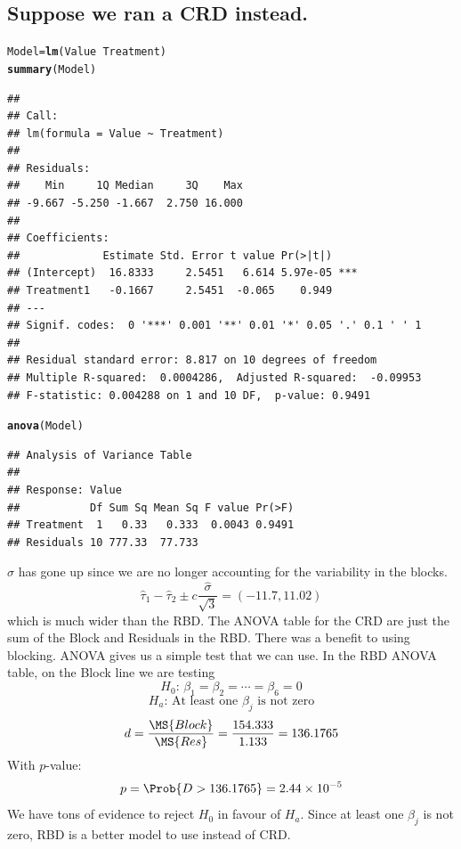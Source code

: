\documentclass[oneside]{book}\usepackage[]{graphicx}\usepackage[dvipsnames,table,xcdraw]{xcolor}
\makeatletter
\newcommand{\hlopt}[1]{\textcolor[rgb]{0,0,0}{#1}}%
\newcommand{\hlstd}[1]{\textcolor[rgb]{0.345,0.345,0.345}{#1}}%
\newcommand{\hlkwb}[1]{\textcolor[rgb]{0.69,0.353,0.396}{#1}}%
\newcommand{\hlkwd}[1]{\textcolor[rgb]{0.737,0.353,0.396}{\textbf{#1}}}%
\newenvironment{kframe}{%
 \def\at@end@of@kframe{}%
 \ifinner\ifhmode%
  \def\at@end@of@kframe{\end{minipage}}%
  \begin{minipage}{\columnwidth}%
 \fi\fi%
 \def\FrameCommand##1{\hskip\@totalleftmargin \hskip-\fboxsep
 \colorbox{shadecolor}{##1}\hskip-\fboxsep
     \hskip-\linewidth \hskip-\@totalleftmargin \hskip\columnwidth}%
 \MakeFramed {\advance\hsize-\width
   \@totalleftmargin\z@ \linewidth\hsize
   \@setminipage}}%
 {\par\unskip\endMakeFramed%
 \at@end@of@kframe}
\newenvironment{knitrout}{}{} %
\makeatother
\begin{document}
\subsection*{Suppose we ran a CRD instead.}
\begin{knitrout}
\color{fgcolor}\begin{kframe}
\begin{alltt}
\hlstd{Model} \hlkwb{=} \hlkwd{lm}\hlstd{(Value} \hlopt{~} \hlstd{Treatment)}
\hlkwd{summary}\hlstd{(Model)}
\end{alltt}
\begin{verbatim}
## 
## Call:
## lm(formula = Value ~ Treatment)
## 
## Residuals:
##    Min     1Q Median     3Q    Max 
## -9.667 -5.250 -1.667  2.750 16.000 
## 
## Coefficients:
##             Estimate Std. Error t value Pr(>|t|)    
## (Intercept)  16.8333     2.5451   6.614 5.97e-05 ***
## Treatment1   -0.1667     2.5451  -0.065    0.949    
## ---
## Signif. codes:  0 '***' 0.001 '**' 0.01 '*' 0.05 '.' 0.1 ' ' 1
## 
## Residual standard error: 8.817 on 10 degrees of freedom
## Multiple R-squared:  0.0004286,	Adjusted R-squared:  -0.09953 
## F-statistic: 0.004288 on 1 and 10 DF,  p-value: 0.9491
\end{verbatim}
\begin{alltt}
\hlkwd{anova}\hlstd{(Model)}
\end{alltt}
\begin{verbatim}
## Analysis of Variance Table
## 
## Response: Value
##           Df Sum Sq Mean Sq F value Pr(>F)
## Treatment  1   0.33   0.333  0.0043 0.9491
## Residuals 10 777.33  77.733
\end{verbatim}
\end{kframe}
\end{knitrout}

$ \hat{\sigma} $ has gone up since we are no longer accounting for the variability
in the blocks.
\[ \hat{\tau}_1-\hat{\tau}_2\pm c \frac{\hat{\sigma}}{\sqrt{3}}=(-11.7,11.02) \]
which is much wider than the RBD\@. The ANOVA table for the CRD
are just the sum of the Block and Residuals in the RBD\@.
There was a benefit to using blocking. ANOVA gives us a simple test that we can use.
In the RBD ANOVA table, on the Block line we are testing
\[ H_0\text{: }\beta_1=\beta_2=\cdots=\beta_6=0 \]
\[ H_a\text{: At least one $\beta_j$ is not zero} \]
\[ d=\frac{\MS{Block}}{\MS{Res}}=\frac{154.333}{1.133}=136.1765   \]
With $ p $-value:
\[ p=\Prob{D>136.1765}=2.44\times 10^{-5} \]
We have tons of evidence to reject $ H_0 $ in favour of $ H_a $.
Since at least one $ \beta_j $ is not zero, RBD is a better model to use
instead of CRD\@.
\end{document}
